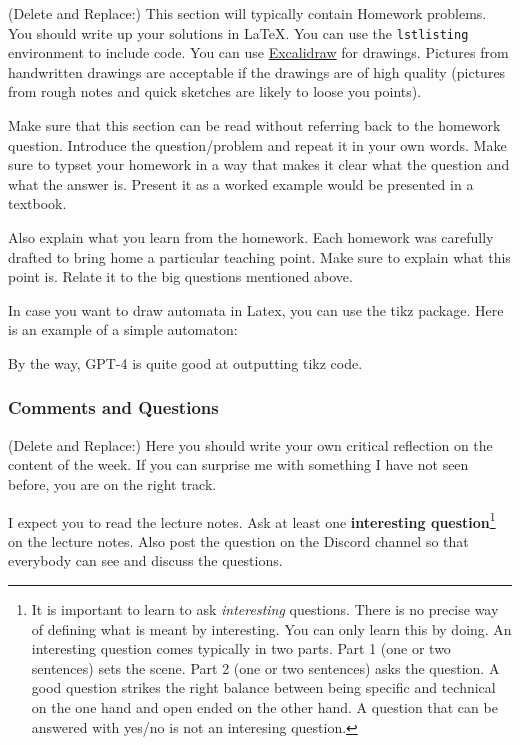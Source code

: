 \documentclass{article}
\theoremstyle{theorem}
\theoremstyle{definition}
\theoremstyle{remark}
\begin{document}
(Delete and Replace:) This section will typically contain Homework problems. You should write up your solutions in \LaTeX. You can use the \texttt{lstlisting} environment to include code. You can use \href{https://excalidraw.com/}{Excalidraw} for drawings. Pictures from handwritten drawings are acceptable if the drawings are of high quality (pictures from rough notes and quick sketches are likely to loose you points). 

Make sure that this section can be read without referring back to the homework question. Introduce the question/problem and repeat it in your own words. Make sure to typset your homework in a way that makes it clear what  the question and what the answer is. Present it as a worked example would be presented in a textbook. 

Also explain what you learn from the homework. Each homework was carefully drafted to bring home a particular teaching point. Make sure to explain what this point is. Relate it to the big questions mentioned above. 

In case you want to draw automata in Latex, you can use the tikz package. Here is an example of a simple automaton:


By the way, GPT-4 is quite good at outputting tikz code.
\subsubsection*{Comments and Questions}

(Delete and Replace:) Here you should write your own critical reflection on the content of the week. If you can surprise me with something I have not seen before, you are on the right track.

I expect you to read the lecture notes. Ask at least one \textbf{interesting question}\footnote{It is important to learn to ask \emph{interesting} questions. There is no precise way of defining what is meant by interesting. You can only learn this by doing. An interesting question comes typically in two parts. Part 1 (one or two sentences) sets the scene. Part 2 (one or two sentences) asks the question. A good question strikes the right balance between being specific and technical on the one hand and open ended on the other hand. A question that can be answered with yes/no is not an interesing question.} on the lecture notes. Also post the question on the Discord channel so that everybody can see and discuss the questions.
\end{document}

